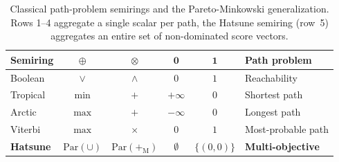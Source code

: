 \documentclass[11pt, letterpaper]{article}
\theoremstyle{definition}
\theoremstyle{remark}
\begin{document}
\begin{table}[ht]
\centering
\small
\setlength{\tabcolsep}{5pt}
\caption{Classical path-problem semirings and the Pareto-Minkowski generalization.
Rows 1--4 aggregate a single scalar per path, the Hatsune semiring (row~5) aggregates
an entire set of non-dominated score vectors.}
\label{tab:semiring-family}
\begin{tabular}{@{}lccccl@{}}
\toprule
\textbf{Semiring} & $\oplus$ & $\otimes$ & $\mathbf{0}$ & $\mathbf{1}$ & \textbf{Path problem} \\
\midrule
Boolean     & $\lor$  & $\land$   & $0$        & $1$          & Reachability \\
Tropical    & $\min$  & $+$       & $+\infty$  & $0$          & Shortest path \\
Arctic      & $\max$  & $+$       & $-\infty$  & $0$          & Longest path \\
Viterbi     & $\max$  & $\times$  & $0$        & $1$          & Most-probable path \\
\midrule
\textbf{Hatsune} & $\mathrm{Par}({\cup})$ & $\mathrm{Par}({+_{\!\scriptscriptstyle\mathrm{M}}})$ & $\emptyset$ & $\{(0,0)\}$ & \textbf{Multi-objective} \\
\bottomrule
\end{tabular}
\end{table}
\end{document}
